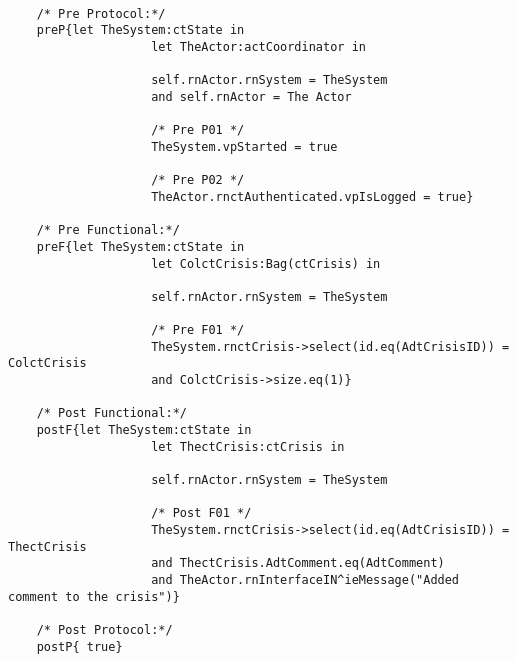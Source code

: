 	\scriptsize
	\vspace{0.5cm}
	\begin{lstlisting}[style=MessirStyle,firstnumber=auto,captionpos=b,caption={\msrmessir (MCL-oriented) specification of the operation \emph{oeReportOnCrisis}.},label=OM-actCoordinator-oeReportOnCrisis-MCL-LST]

	/* Pre Protocol:*/ 
	preP{let TheSystem:ctState in
					let TheActor:actCoordinator in
					
					self.rnActor.rnSystem = TheSystem
					and self.rnActor = The Actor
					
					/* Pre P01 */
					TheSystem.vpStarted = true
					
					/* Pre P02 */
					TheActor.rnctAuthenticated.vpIsLogged = true}
	
	/* Pre Functional:*/
	preF{let TheSystem:ctState in
					let ColctCrisis:Bag(ctCrisis) in
				
					self.rnActor.rnSystem = TheSystem
				
					/* Pre F01 */
					TheSystem.rnctCrisis->select(id.eq(AdtCrisisID)) = ColctCrisis
					and ColctCrisis->size.eq(1)}
	
	/* Post Functional:*/ 
	postF{let TheSystem:ctState in
					let ThectCrisis:ctCrisis in
				
					self.rnActor.rnSystem = TheSystem
				
					/* Post F01 */
					TheSystem.rnctCrisis->select(id.eq(AdtCrisisID)) = ThectCrisis
					and ThectCrisis.AdtComment.eq(AdtComment)
					and TheActor.rnInterfaceIN^ieMessage("Added comment to the crisis")}
	
	/* Post Protocol:*/ 
	postP{ true}
	
	\end{lstlisting}
	\normalsize 
	
	
	
	





